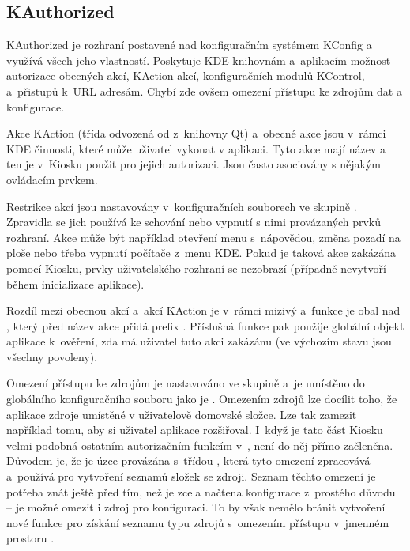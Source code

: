 \subsection{KAuthorized}
KAuthorized je rozhraní postavené nad konfiguračním systémem KConfig a využívá všech jeho vlastností. Poskytuje KDE knihovnám a~aplikacím možnost autorizace obecných akcí, KAction akcí, konfiguračních modulů KControl, a~přistupů k~URL adresám. Chybí zde ovšem omezení přístupu ke zdrojům dat a konfigurace.

Akce KAction (třída  odvozená od  z~knihovny Qt) a~obecné akce jsou v~rámci KDE činnosti, které může uživatel vykonat v aplikaci. Tyto akce mají název a ten je v~Kiosku použit pro jejich autorizaci. Jsou často asociovány s nějakým ovládacím prvkem.

Restrikce akcí jsou nastavovány v~konfiguračních souborech ve skupině . Zpravidla se jich používá ke schování nebo vypnutí s nimi provázaných prvků rozhraní. Akce může být například otevření menu s~nápovědou, změna pozadí na ploše nebo třeba vypnutí počítače z~menu KDE. Pokud je taková akce zakázána pomocí Kiosku, prvky uživatelského rozhraní se nezobrazí (případně nevytvoří během inicializace aplikace).

Rozdíl mezi obecnou akcí a~akcí KAction je v~rámci  mizivý a~funkce \linebreak{} je obal nad , který před název akce přidá prefix . Příslušná funkce pak použije globální  objekt aplikace k~ověření, zda má uživatel tuto akci zakázánu (ve výchozím stavu jsou všechny povoleny).

Omezení přístupu ke zdrojům je nastavováno ve skupině  a~je umístěno do globálního konfiguračního souboru jako je . Omezením zdrojů lze docílit toho, že aplikace  zdroje umístěné v uživatelově domovské složce. Lze tak zamezit například tomu, aby si uživatel aplikace rozšiřoval. I~když je tato část Kiosku velmi podobná ostatním autorizačním funkcím v~, není do něj přímo začleněna. Důvodem je, že je úzce provázána s~třídou , která tyto omezení zpracovává a~používá pro vytvoření seznamů složek se zdroji. Seznam těchto omezení je potřeba znát ještě před tím, než je zcela načtena konfigurace z~prostého důvodu -- je možné omezit i zdroj pro konfiguraci. To by však nemělo bránit vytvoření nové funkce pro získání seznamu typu zdrojů s~omezením přístupu v~jmenném prostoru .

